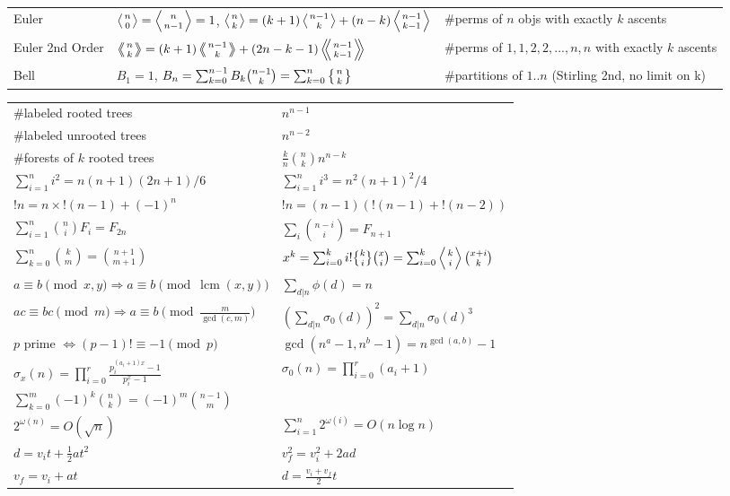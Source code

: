 \documentclass[11.5pt,a4paper,landscape,oneside]{amsart}
\DeclareMathOperator{\lcm}{lcm}
\DeclareRobustCommand{\stirling}{\genfrac\{\}{0pt}{}}
\begin{document}
\begin{multicols*}{2}
\begin{tabular}{@{}l|l|l@{}}
    Euler	& $\left \langle {n\atop 0} \right \rangle = \left \langle {n\atop n-1} \right \rangle = 1 $, $\left \langle {n\atop k} \right \rangle = (k+1) \left \langle {n-1\atop {k}} \right \rangle + (n-k)\left \langle {{n-1}\atop {k-1}} \right \rangle$ & \#perms of $n$ objs with exactly $k$ ascents \\
    Euler 2nd Order &  $\left \langle \!\!\left \langle {n\atop k} \right \rangle \!\! \right \rangle = (k+1) \left \langle \!\! \left \langle {{n-1}\atop {k}} \right \rangle \!\! \right \rangle +(2n-k-1)\left \langle \!\! \left \langle {{n-1}\atop {k-1}} \right \rangle  \!\! \right \rangle$ & \#perms of ${1,1,2,2,...,n,n}$ with exactly $k$ ascents \\
    Bell & $B_1 = 1$, $B_n = \sum_{k=0}^{n-1} B_k \binom{n-1}{k} = \sum_{k=0}^n\left\{{n\atop k}\right\}$ & \#partitions of $1..n$ (Stirling 2nd, no limit on k)\\
    \bottomrule
    \end{tabular}

    \vspace{10pt}
    \begin{tabular}{ll}
        \#labeled rooted trees & $n^{n-1}$ \\
        \#labeled unrooted trees & $n^{n-2}$ \\
        \#forests of $k$ rooted trees & $\frac{k}{n}\binom{n}{k}n^{n-k}$ \\
        $\sum_{i=1}^n i^2 = n(n+1)(2n+1)/6$ & $\sum_{i=1}^n i^3 = n^2(n+1)^2/4$ \\
        $!n = n\times!(n-1)+(-1)^n$ & $!n = (n-1)(!(n-1)+!(n-2))$ \\
        $\sum_{i=1}^n \binom{n}{i} F_i = F_{2n}$ & $\sum_{i} \binom{n-i}{i} = F_{n+1}$ \\
        $\sum_{k=0}^n \binom{k}{m} = \binom{n+1}{m+1}$ & $x^k = \sum_{i=0}^k i!\stirling{k}{i}\binom{x}{i} = \sum_{i=0}^k \left\langle {k \atop i} \right\rangle\binom{x+i}{k}$ \\

        $a\equiv b\pmod{x,y} \Rightarrow a\equiv b\pmod{\lcm(x,y)}$ & $\sum_{d|n} \phi(d) = n$ \\
        $ac\equiv bc\pmod{m} \Rightarrow a\equiv b\pmod{\frac{m}{\gcd(c,m)}}$ & $(\sum_{d|n} \sigma_0(d))^2 = \sum_{d|n} \sigma_0(d)^3$ \\
        $p$ prime $\Leftrightarrow (p-1)!\equiv -1\pmod{p}$ & $\gcd(n^a-1,n^b-1) = n^{\gcd(a,b)}-1$ \\
        $\sigma_x(n) = \prod_{i=0}^{r} \frac{p_i^{(a_i + 1)x} - 1}{p_i^x - 1}$ & $\sigma_0(n) = \prod_{i=0}^r (a_i + 1)$ \\
        $\sum_{k=0}^m (-1)^k \binom{n}{k} = (-1)^m \binom{n-1}{m}$ & \\
        $2^{\omega(n)} = O(\sqrt{n})$ & $\sum_{i=1}^n 2^{\omega(i)} = O(n \log n)$ \\
        $d = v_i t + \frac{1}{2}at^2$ & $v_f^2 = v_i^2 + 2ad$ \\
        $v_f = v_i + at$ & $d = \frac{v_i + v_f}{2}t$ \\
    \end{tabular}

\end{multicols*}
\end{document}
